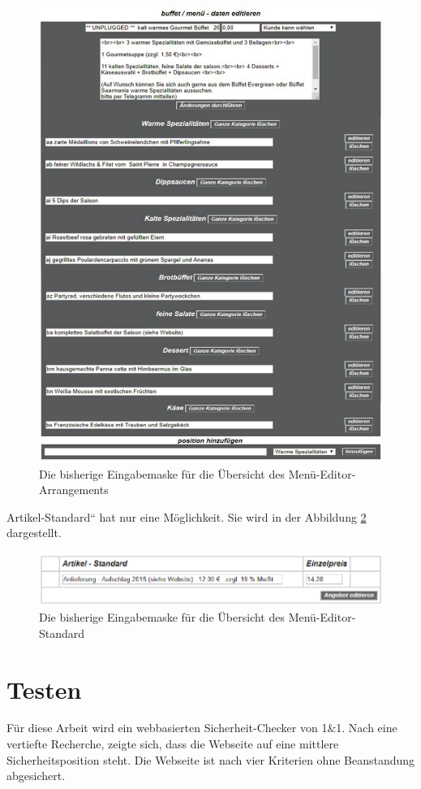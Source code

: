 \begin{figure}[h]
	\centering
	\includegraphics[width=0.7\linewidth]{Graphics/arrangement-Menue-editor.pdf}
		\caption[Kun2deansicht]{Die bisherige Eingabemaske für die Übersicht des Menü-Editor-Arrangements}
	\label{fig: Editor-Menü2}
\end{figure}


Artikel-Standard“ hat nur eine Möglichkeit. Sie wird in der Abbildung \ref{fig: Editor-Menü-Standard}   dargestellt.

\begin{figure}[h]
	\centering
	\includegraphics[width=0.7\linewidth]{Graphics/menuStandart.png}
	\caption[Kundeansicht]{Die bisherige Eingabemaske für die Übersicht des Menü-Editor-Standard}
	\label{fig: Editor-Menü-Standard}
\end{figure}




\section{Testen} 


Für diese Arbeit wird ein webbasierten Sicherheit-Checker von 1\&1. Nach eine vertiefte Recherche, zeigte sich, dass die Webseite auf eine mittlere Sicherheitsposition steht. Die Webseite ist nach vier Kriterien ohne Beanstandung abgesichert.

